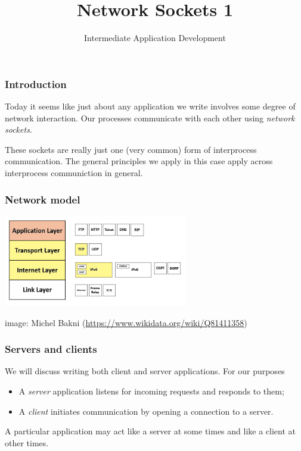 \documentclass[10pt]{beamer}
\title{Network Sockets 1}
\author[IN608]{Intermediate Application Development}
\institute[Otago Polytechnic]{
  Otago Polytechnic \\
  Dunedin, New Zealand \\
  Kaiako: Tom Clark
}
\date{}
\begin{document}
\begin{frame}[plain]
  \titlepage
\end{frame}

\begin{frame}
  \frametitle{Introduction}
  
  Today it seems like just about any application we write involves some
  degree of network interaction. Our processes communicate with each other 
  using \emph{network sockets}.
  
  These sockets are really just one (very common) form of interprocess communication.
  The general principles we apply in this case apply across  interprocess communiction
  in general.
  
  \end{frame}

\begin{frame}
  \frametitle{Network model}
  
  \includegraphics[width=8cm]{tcp-ip.png}
  
  {\tiny image: Michel Bakni (\url{https://www.wikidata.org/wiki/Q81411358})}  
  \end{frame}

\begin{frame}
  \frametitle{Servers and clients}
  
  We will discuss writing both client and server applications. For
  our purposes
  
  \begin{itemize}
    \item A \emph{server} application listens for incoming requests and responds to them;
    
    \item A \emph{client} initiates communication by opening a connection to a server.
  \end{itemize}
  
  A particular application may act like a server at some times and like a client at other times. 
    
  \end{frame}
\end{document}
